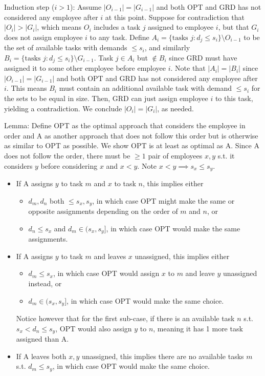 \documentclass[11pt]{article}
\begin{document}
Induction step ($i>1$): Assume $|O_{i-1}|=|G_{i-1}|$ and both OPT and GRD has not considered any employee after $i$ at this point. Suppose for contradiction that $|O_i|>|G_i|$, which means $O_i$ includes a task $j$ assigned to employee $i$, but that $G_i$ does not assign employee $i$ to any task. Define $A_i=\{\text{tasks } j: d_j\leq s_{i}\}\setminus O_{i-1}$ to be the set of available tasks with demands $\leq s_i$, and similarly $B_i=\{\text{tasks } j: d_j\leq s_{i}\}\setminus G_{i-1}$. Task $j\in A_i$ but $\notin B_i$ since GRD must have assigned it to some other employee before employee $i$. Note that $|A_i|=|B_i|$ since $|O_{i-1}|=|G_{i-1}|$ and both OPT and GRD has not considered any employee after $i$. This means $B_i$ must contain an additional available task with demand $\leq s_i$ for the sets to be equal in size. Then, GRD can just assign employee $i$ to this task, yielding a contradiction. We conclude $|O_i|=|G_i|$, as needed.

Lemma: Define OPT as the optimal approach that considers the employee in order and A as another approach that does not follow this order but is otherwise as similar to OPT as possible. We show OPT is at least as optimal as A. Since A does not follow the order, there must be $\geq 1$ pair of employees $x,y$ s.t. it considers $y$ before considering $x$ and $x<y$. Note $x<y\implies s_x\leq s_y$.

\begin{itemize}
    \item If A assigns $y$ to task $m$ and $x$ to task $n$, this implies either
    \begin{itemize}
        \item $d_m,d_n$ both $\leq s_x,s_y$, in which case OPT might make the same or opposite assignments depending on the order of $m$ and $n$, or
        \item $d_n\leq s_x$ and $d_m \in (s_x,s_y]$, in which case OPT would make the same assignments.
    \end{itemize}
    \item If A assigns $y$ to task $m$ and leaves $x$ unassigned, this implies either
    \begin{itemize}
        \item $d_m\leq s_x$, in which case OPT would assign $x$ to $m$ and leave $y$ unassigned instead, or
        \item $d_m\in (s_x,s_y]$, in which case OPT would make the same choice.
    \end{itemize} Notice however that for the first sub-case, if there is an available task $n$ s.t. $s_x < d_n \leq s_y$, OPT would also assign $y$ to $n$, meaning it has 1 more task assigned than A.
    \item If A leaves both $x,y$ unassigned, this implies there are no available tasks $m$ s.t. $d_m\leq s_y$, in which case OPT would make the same choice.
\end{itemize}
\end{document}
